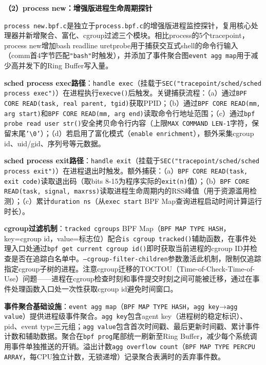 \documentclass[a4paper]{ctexart}
\makeatletter
\renewcommand{\_}{%
  \ifmmode
    \nfss@text{\textunderscore}%
  \else
    \textunderscore\discretionary{}{}{}%
  \fi}
\makeatother
\begin{document}
\textbf{（2）process\_new：增强版进程生命周期探针}


\texttt{process\_new.bpf.c}是独立于\texttt{process.bpf.c}的增强版进程监控探针，复用核心处理器并新增聚合、富化、cgroup过滤三个模块。相比process的5个tracepoint，process\_new增加bash readline uretprobe用于捕获交互式shell的命令行输入（comm首4字节匹配\texttt{"bash"}时触发），并添加了事件聚合图\allowbreak\texttt{event\_agg\_map}用于减少高并发下的Ring Buffer写入量。


\textbf{sched\_process\_exec路径}：\texttt{handle\_exec}（挂载于\texttt{SEC(\allowbreak"tracepoint\allowbreak/sched\allowbreak/sched\_process\_exec\allowbreak")}）在进程执行\texttt{execve()}后触发。关键捕获流程：（a）通过\texttt{BPF\_CORE\_READ(task, real\_parent, tgid)}获取PPID；（b）通过\texttt{BPF\_CORE\_READ(mm, arg\_start)}和\texttt{BPF\_CORE\_READ(mm, arg\_end)}读取命令行地址范围；（c）通过\texttt{bpf\_probe\_read\_user\_str()}安全拷贝命令行内容（上限\texttt{MAX\_COMMAND\_LEN-1}字符，保留末尾\texttt{'\textbackslash{}0'}）；（d）若启用了富化模式（\texttt{enable\_enrichment}），额外采集cgroup\_id、uid/gid、序列号等元数据。


\textbf{sched\_process\_exit路径}：\texttt{handle\_exit}（挂载于\texttt{SEC(\allowbreak"tracepoint\allowbreak/sched\allowbreak/sched\_process\_exit\allowbreak")}）在进程退出时触发。额外捕获：（a）\texttt{BPF\_CORE\_READ(task, exit\_code)}读取退出码（取bits 8-15为程序实际的\texttt{exit(n)}值）；（b）\texttt{BPF\_CORE\_READ(task, signal, maxrss)}读取进程生命周期内的RSS峰值（用于资源滥用检测）；（c）累计\texttt{duration\_ns}（从\texttt{exec\_start} BPF Map查询进程启动时间计算运行时长）。


\textbf{cgroup过滤机制}：\texttt{tracked\_cgroups} BPF Map（\texttt{BPF\_MAP\_TYPE\_HASH}，key=cgroup\_id，value=标志位）配合\texttt{is\_cgroup\_tracked()}辅助函数，在事件处理入口处通过\texttt{bpf\_get\_current\_cgroup\_id()}即时获取当前进程的cgroup ID并检查是否在追踪白名单中。\texttt{--cgroup-filter-children}参数激活此机制，限制仅追踪指定cgroup子树的进程。注意cgroup迁移的TOCTOU（Time-of-Check-Time-of-Use）问题——进程在cgroup检查时刻和事件提交时刻之间可能被迁移，通过在事件处理函数入口处一次性获取cgroup\_id避免时间窗口。


\textbf{事件聚合基础设施}：\texttt{event\_agg\_map}（\texttt{BPF\_MAP\_TYPE\_HASH}，\texttt{agg\_key}→\texttt{agg\_value}）提供进程级事件聚合。\texttt{agg\_key}包含agent\_key（进程树的稳定标识）、pid、event\_type三元组；\texttt{agg\_value}包含首次时间戳、最后更新时间戳、累计事件计数和辅助数据。聚合在\texttt{bpf\_prog}尾部统一刷新至Ring Buffer，减少每个系统调用事件单独推送的开销。溢出计数\texttt{agg\_overflow\_count}（\texttt{BPF\_MAP\_TYPE\_PERCPU\_ARRAY}，每CPU独立计数，无锁递增）记录聚合表满时的丢弃事件数。
\end{document}
